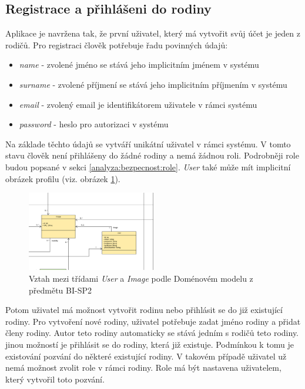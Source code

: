    \subsection{Registrace a přihlášeni do rodiny}
        Aplikace je navržena tak, že první uživatel, který má vytvořit svůj účet je jeden z rodičů. Pro registraci člověk potřebuje řadu povinných údajů:
        \begin{itemize}
	        \item \textit{name} - zvolené jméno se stává jeho implicitním jménem v systému
	        \item \textit{surname} - zvolené příjmení se stává jeho implicitním příjmením v systému
	        \item \textit{email} - zvolený email je identifikátorem uživatele v rámci systému
	        \item \textit{password} - heslo pro autorizaci v systému
        \end{itemize}
        Na základe těchto údajů se vytváří unikátní uživatel v rámci systému. V tomto stavu člověk není přihlášeny do žádné rodiny a nemá žádnou roli. Podrobněji role budou popsané v sekci \ref{analyza:bezpecnost:role}. \textit{User} také může mít implicitní obrázek profilu (viz. obrázek \ref{image:User-Image1}).
        \begin{figure}\centering
	        \includegraphics[width=0.5\textwidth]{pdfs/User-Image1}
	        \caption[Návrh User-Image]{Vztah mezi třídami \textit{User} a \textit{Image} podle Doménovém modelu z předmětu BI-SP2}\label{image:User-Image1}
        \end{figure}
        
        Potom uživatel má možnost vytvořit rodinu nebo přihlásit se do již existující rodiny. Pro vytvoření nové rodiny, uživatel potřebuje zadat jméno rodiny a přidat členy rodiny. Autor teto rodiny automaticky se stává jedním s rodičů teto rodiny. jinou možností je přihlásit se do rodiny, která již existuje. Podmínkou k tomu je existování pozvání do některé existující rodiny. V takovém případě uživatel už nemá možnost zvolit role v rámci rodiny. Role má být nastavena uživatelem, který vytvořil toto pozvání.

